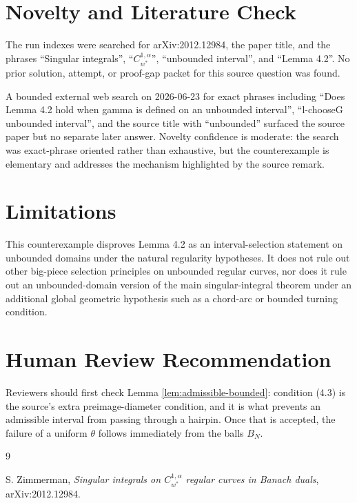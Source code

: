 \documentclass[11pt]{article}
\begin{document}
\section*{Novelty and Literature Check}

The run indexes were searched for arXiv:2012.12984, the paper title, and the
phrases ``Singular integrals'', ``\(C_{w^*}^{1,\alpha}\)'', ``unbounded
interval'', and ``Lemma 4.2''.  No prior solution, attempt, or proof-gap packet
for this source question was found.

A bounded external web search on 2026-06-23 for exact phrases including
``Does Lemma 4.2 hold when gamma is defined on an unbounded interval'',
``l-chooseG unbounded interval'', and the source title with ``unbounded''
surfaced the source paper but no separate later answer.  Novelty confidence is
moderate: the search was exact-phrase oriented rather than exhaustive, but the
counterexample is elementary and addresses the mechanism highlighted by the
source remark.

\section*{Limitations}

This counterexample disproves Lemma 4.2 as an interval-selection statement on
unbounded domains under the natural regularity hypotheses.  It does not rule
out other big-piece selection principles on unbounded regular curves, nor does
it rule out an unbounded-domain version of the main singular-integral theorem
under an additional global geometric hypothesis such as a chord-arc or bounded
turning condition.

\section*{Human Review Recommendation}

Reviewers should first check Lemma \ref{lem:admissible-bounded}: condition
(4.3) is the source's extra preimage-diameter condition, and it is what prevents
an admissible interval from passing through a hairpin.  Once that is accepted,
the failure of a uniform \(\theta\) follows immediately from the balls \(B_N\).

\begin{thebibliography}{9}

S. Zimmerman,
\emph{Singular integrals on \(C_{w^*}^{1,\alpha}\) regular curves in Banach duals},
arXiv:2012.12984.

\end{thebibliography}
\end{document}
